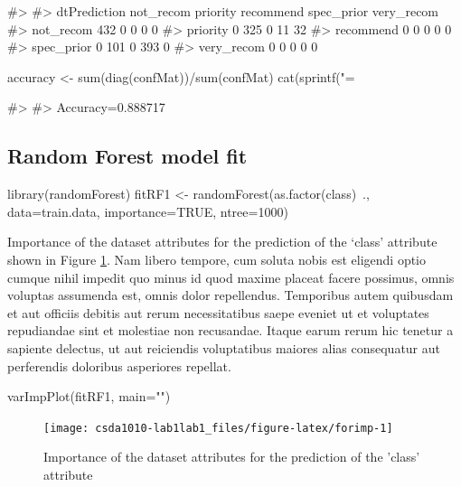 \begin{Schunk}
\begin{Soutput}
#>             
#> dtPrediction not_recom priority recommend spec_prior very_recom
#>   not_recom        432        0         0          0          0
#>   priority           0      325         0         11         32
#>   recommend          0        0         0          0          0
#>   spec_prior         0      101         0        393          0
#>   very_recom         0        0         0          0          0
\end{Soutput}
\begin{Sinput}
accuracy <- sum(diag(confMat))/sum(confMat)
cat(sprintf("\nAccuracy=%
\end{Sinput}
\begin{Soutput}
#> 
#> Accuracy=0.888717
\end{Soutput}
\end{Schunk}

\hypertarget{random-forest-model-fit}{%
\subsection{Random Forest model fit}\label{random-forest-model-fit}}

\begin{Schunk}
\begin{Sinput}
library(randomForest)
fitRF1 <- randomForest(as.factor(class)~.,
                      data=train.data, 
                      importance=TRUE, 
                      ntree=1000)
\end{Sinput}
\end{Schunk}

Importance of the dataset attributes for the prediction of the `class'
attribute shown in Figure \ref{fig:forimp}. Nam libero tempore, cum
soluta nobis est eligendi optio cumque nihil impedit quo minus id quod
maxime placeat facere possimus, omnis voluptas assumenda est, omnis
dolor repellendus. Temporibus autem quibusdam et aut officiis debitis
aut rerum necessitatibus saepe eveniet ut et voluptates repudiandae sint
et molestiae non recusandae. Itaque earum rerum hic tenetur a sapiente
delectus, ut aut reiciendis voluptatibus maiores alias consequatur aut
perferendis doloribus asperiores repellat.

\begin{Schunk}
\begin{Sinput}
varImpPlot(fitRF1, main="")
\end{Sinput}
\begin{figure}

{\centering \texttt{[image: csda1010-lab1lab1\_files/figure-latex/forimp-1]} 

}

\caption[Importance of the dataset attributes for the prediction of the 'class' attribute]{Importance of the dataset attributes for the prediction of the 'class' attribute}\label{fig:forimp}
\end{figure}
\end{Schunk}

